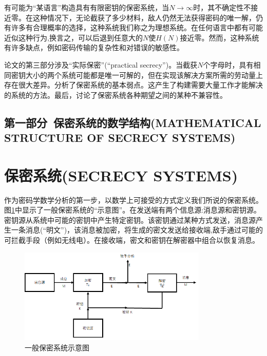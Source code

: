\documentclass[]{article}
\begin{document}
有可能为“某语言”构造具有有限密钥的保密系统，当$N\rightarrow \infty$时，其不确定性不接近零。在这种情况下，无论截获了多少材料，敌人仍然无法获得密码的唯一解，仍有许多有合理概率的选择，这种系统我们称之为理想系统。在任何语言中都有可能近似这种行为,换言之，可以后退到任意大的$N$使$H(N)$接近零。然而，这种系统有许多缺点，例如密码传输的复杂性和对错误的敏感性。

论文的第三部分涉及“实际保密”(“practical secrecy”)。当截获$N$个字母时，具有相同密钥大小的两个系统可能都是唯一可解的，但在实现该解决方案所需的劳动量上存在很大差异。分析了保密系统的基本弱点。这产生了构建需要大量工作才能解决的系统的方法。最后，讨论了保密系统各种期望之间的某种不兼容性。

\newpage

\begin{center}
	\section*{第一部分\ 保密系统的数学结构(MATHEMATICAL STRUCTURE OF SECRECY SYSTEMS)}
\end{center}

%   
%

\section{保密系统(SECRECY SYSTEMS)}

作为密码学数学分析的第一步，以数学上可接受的方式定义我们所说的保密系统。图\ref{Fig:fig1}中显示了一般保密系统的“示意图”。在发送端有两个信息源:消息源和密钥源。密钥源从系统中可能的密钥中产生特定密钥。该密钥通过某种方式发送，消息源产生一条消息(“明文”)，该消息被加密，将生成的密文发送给接收端,敌手通过可能的可拦截手段（例如无线电）。在接收端，密文和密钥在解密器中组合以恢复消息。
\par

\begin{figure}[htbp]
	\centering
	\includegraphics[width=0.8\textwidth]{general-secrecy-system.png}
	\caption{一般保密系统示意图}
	\label{Fig:fig1}
\end{figure}
\end{document}
